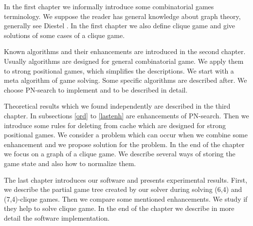 In the first chapter we informally introduce some combinatorial
games terminology. We suppose the reader has general knowledge about graph theory, 
generally see Diestel \cite{ramsey}. In the first chapter we also define clique game and give
solutions of some cases of a clique game.

Known algorithms and their enhancements are introduced in the second chapter. Usually
algorithms are designed for general combinatorial game. We apply them to
strong positional games, which simplifies the descriptions. We start with a meta
algorithm of game solving. Some specific algorithms are described after. We choose PN-search to
implement and to be described in detail.

Theoretical results which we found independently are described in the third chapter.
In subsections \ref{ord} to \ref{lastenh} are enhancements of PN-search. Then we introduce some rules for
deleting from cache which are designed for strong positional games. We consider
a problem which can occur when we combine some enhancement and we
propose solution for the problem. In the end of the chapter we focus on
a graph of a clique game. We describe several ways of storing
the game state and also how to normalize them.

The last chapter introduces our software and presents experimental results.
First, we describe the partial game tree created by our solver during solving
(6,4) and (7,4)-clique games. Then we compare some mentioned enhancements. We
study if they help to solve clique game. In the end of the chapter we describe in
more detail the software implementation.
